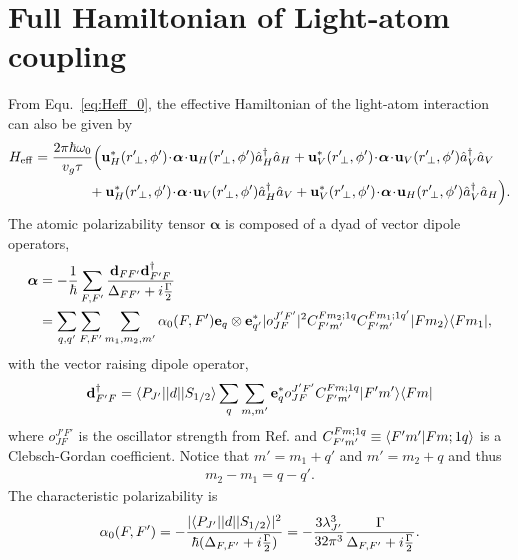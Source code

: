 \documentclass[preprint,aps,pra,onecolumn]{revtex4-1} %
\renewcommand{\tensor}[1]{\boldsymbol{#1}}
\begin{document}
\section{Full Hamiltonian of Light-atom coupling}\label{sec:EffectiveHamiltonian_CG}
From Equ.~\eqref{eq:Heff_0}, the effective Hamiltonian of the light-atom interaction can also be given by
\begin{align}  
	H_{\rm eff}   = \frac{2\pi \hbar \omega_0}{ v_g \tau} &\Big( \mathbf{u}^*_H(r^\prime\!_\perp, \phi') 
	\!\cdot\! 
	\tensor{\alpha} \!\cdot\! \mathbf{u}_{H}(r^\prime\!_\perp, \phi') \hat{a}\dg_H \hat{a}_H +  
	\mathbf{u}^*_V(r^\prime\!_\perp, \phi')\! \cdot\! 
	\tensor{\alpha} \!\cdot\! \mathbf{u}_{V}(r^\prime\!_\perp, \phi') \hat{a}\dg_V \hat{a}_V \nonumber\\
	&\!\! + \mathbf{u}^*_H(r^\prime\!_\perp, \phi')\! \cdot\! \tensor{\alpha}\! \cdot\! 
	\mathbf{u}_{V}(r^\prime\!_\perp, \phi') \hat{a}\dg_H \hat{a}_V 
	+ \mathbf{u}^*_V(r^\prime\!_\perp, \phi') \!\cdot\! \tensor{\alpha}\! \cdot\! 
	\mathbf{u}_{H}(r^\prime\!_\perp, 
	\phi') \hat{a}\dg_V \hat{a}_H 
	\Big).  \label{eq:LightShiftHam_CG}
\end{align}
The atomic polarizability tensor $\tensor{\alpha}$ is composed of a dyad of vector dipole operators,    
\begin{align}
	\tensor{\alpha} & =  - \frac{1}{\hbar}  \sum_{F,F'} \frac{ \mathbf{d}_{FF'} \mathbf{d}^\dagger_{F'F} 
	}{\Delta_{FF'}+i\frac{\Gamma}{2} } \\
		& = \sum_{q,q'}  \sum_{F,F'} \sum_{m_1, m_2, m'} \alpha_0(F,F') \mathbf{e}_q \otimes 
		\mathbf{e}^*_{q'} | o^{J'F'}_{JF} |^2 C^{Fm_2;1q}_{F'm'} C^{Fm_1;1q'}_{F'm'} \op{F m_2}{F m_1},
\end{align}
with the vector raising  dipole operator,
\begin{align}
	\mathbf{d}^\dagger_{F'F} =  \langle{P_{J'}}\rvert| d |\lvert{S_{1/2}}\rangle \sum_q \sum_{m,m'} \mathbf{e}_q^* 
	o^{J'F'}_{JF} C^{Fm;1q}_{F'm'} \lvert{F'm'}\rangle\langle{Fm}\rvert
\end{align}
where $o^{J'F'}_{JF}$ is the oscillator strength from Ref. \cite{Deutsch2010a} and $C^{Fm;1q}_{F'm'} 
\equiv 
\langle{F'm'}|{Fm;1q}\rangle$ is a Clebsch-Gordan coefficient. 
Notice that $m' = m_1 + q'$ and $m' = m_2 + q$ and thus
\begin{align}
	m_2 - m_1 = q-q'.
\end{align}
The characteristic polarizability is
\begin{align} \label{eq:CharacteristicPolarizability}
	\alpha_0(F,F') = - \frac{ |\langle{P_{J'}}\rvert| d |\lvert{S_{1/2}}\rangle|^2 }{\hbar (\Delta_{F,F'}+i\frac{\Gamma}{2})} = - 
	\frac{3 
	\lambda_{J'}^3}{32 \pi^3} \frac{\Gamma}{\Delta_{F,F'}+i\frac{\Gamma}{2}}.
\end{align}
\end{document}

